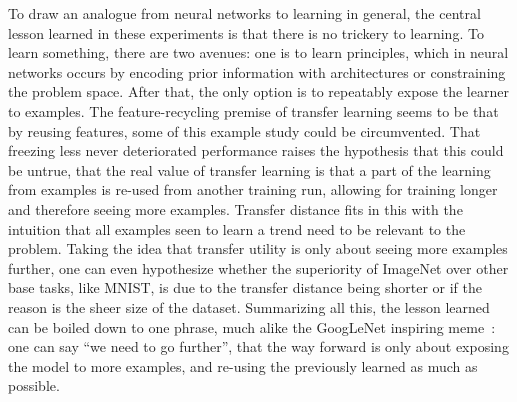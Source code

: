 \documentclass[english,twoside,openright]{UH_DS_MSc}
\begin{document}
To draw an analogue from neural networks to learning in general, the central lesson learned in these experiments 
is that there is no trickery to learning. To learn something, there are two avenues: one is to learn principles, which in 
neural networks occurs by encoding prior information with architectures or constraining the problem space. After that, the only 
option is to repeatably expose the learner to examples. The feature-recycling premise of transfer learning seems to be that 
by reusing features, some of this example study could be circumvented. That freezing less never deteriorated performance
raises the hypothesis that this could be untrue, that the real value of transfer learning is that a part of the learning from 
examples is re-used from another training run, allowing for training longer and therefore seeing more examples. Transfer distance 
fits in this with the intuition that all examples seen to learn a trend need to be relevant to the problem. 
Taking the idea that transfer utility is only about 
seeing more examples further, one can even hypothesize whether the superiority of ImageNet over other base tasks, like MNIST, is 
due to the transfer distance being shorter or if the reason is the sheer size of the dataset. Summarizing all this, the lesson learned
can be boiled down to one phrase, much alike the GoogLeNet inspiring meme~\cite{we_need_to_go_deeper}: one can say ``we need to go further'', that the way forward is only about exposing the model to more examples, 
and re-using the previously learned as much as possible.
\end{document}
